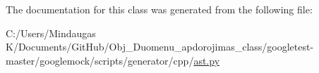 The documentation for this class was generated from the following file\+:\begin{DoxyCompactItemize}
\item 
C\+:/\+Users/\+Mindaugas K/\+Documents/\+Git\+Hub/\+Obj\+\_\+\+Duomenu\+\_\+apdorojimas\+\_\+class/googletest-\/master/googlemock/scripts/generator/cpp/\mbox{\hyperlink{googletest-master_2googlemock_2scripts_2generator_2cpp_2ast_8py}{ast.\+py}}\end{DoxyCompactItemize}
